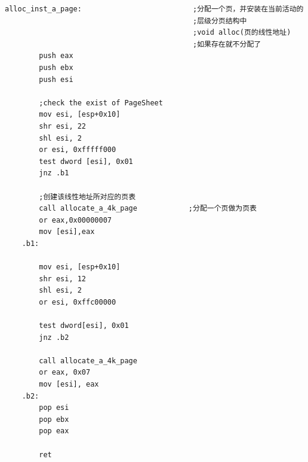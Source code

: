 \documentclass[a4paper,11pt,UTF8]{ctexart}
\begin{document}
	\begin{lstlisting}[language=={[x86masm]Assembler}keywordstyle=\color{blue!70},commentstyle=\color{red!50!green!50!blue!50},frame=shadowbox, rulesepcolor=\color{red!20!green!20!blue!20}]
alloc_inst_a_page:							;分配一个页，并安装在当前活动的
                                            ;层级分页结构中
                                            ;void alloc(页的线性地址)
											;如果存在就不分配了
		push eax
		push ebx
		push esi

		;check the exist of PageSheet
		mov esi, [esp+0x10]
		shr esi, 22
		shl esi, 2
		or esi, 0xfffff000
		test dword [esi], 0x01
		jnz .b1	

		;创建该线性地址所对应的页表 
        call allocate_a_4k_page            ;分配一个页做为页表 
        or eax,0x00000007
        mov [esi],eax   
	.b1:

		mov esi, [esp+0x10]
		shr esi, 12
		shl esi, 2
		or esi, 0xffc00000

		test dword[esi], 0x01
		jnz .b2

		call allocate_a_4k_page
		or eax, 0x07
		mov [esi], eax
	.b2:
		pop esi
		pop ebx
		pop eax

		ret
	\end{lstlisting}
	
	
\end{document}
